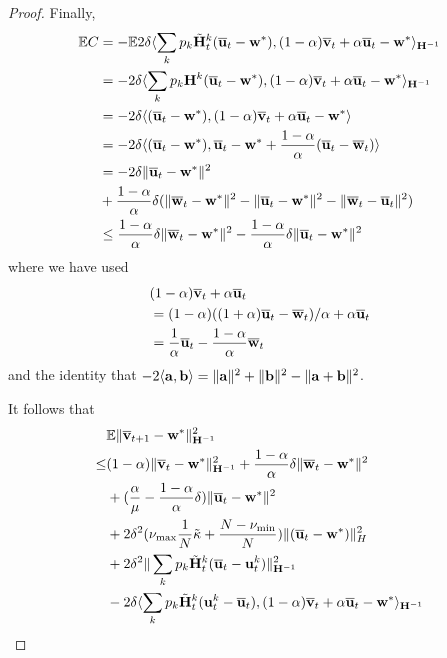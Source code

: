 \begin{proof}
	Finally, 
	\begin{align*}
	\mathbb{E}C & =-\mathbb{E}2\delta\langle\sum_{k}p_{k}\tilde{\vH}_{t}^{k}(\ov{u}_{t}-\vw^{\ast}),(1-\alpha)\ov{v}_{t}+\alpha\ov{u}_{t}-\vw^{\ast}\rangle_{\vH^{-1}}\\
	& =-2\delta\langle\sum_{k}p_{k}\vH^{k}(\ov{u}_{t}-\vw^{\ast}),(1-\alpha)\ov{v}_{t}+\alpha\ov{u}_{t}-\vw^{\ast}\rangle_{\vH^{-1}}\\
	& =-2\delta\langle(\ov{u}_{t}-\vw^{\ast}),(1-\alpha)\ov{v}_{t}+\alpha\ov{u}_{t}-\vw^{\ast}\rangle\\
	& =-2\delta\langle(\ov{u}_{t}-\vw^{\ast}),\ov{u}_{t}-\vw^{\ast}+\frac{1-\alpha}{\alpha}(\ov{u}_{t}-\ov{w}_{t})\rangle\\
	& =-2\delta\|\ov{u}_{t}-\vw^{\ast}\|^{2}\\
	&+\frac{1-\alpha}{\alpha}\delta(\|\ov{w}_{t}-\vw^{\ast}\|^{2}-\|\ov{u}_{t}-\vw^{\ast}\|^{2}-\|\ov{w}_{t}-\ov{u}_{t}\|^{2})\\
	& \leq\frac{1-\alpha}{\alpha}\delta\|\ov{w}_{t}-\vw^{\ast}\|^{2}-\frac{1-\alpha}{\alpha}\delta\|\ov{u}_{t}-\vw^{\ast}\|^{2}
	\end{align*}
	where we have used 
	\begin{align*}
	& (1-\alpha)\ov{v}_{t}+\alpha\ov{u}_{t}\\
	& =(1-\alpha)((1+\alpha)\ov{u}_{t}-\ov{w}_{t})/\alpha+\alpha\ov{u}_{t}\\
	& =\frac{1}{\alpha}\ov{u}_{t}-\frac{1-\alpha}{\alpha}\ov{w}_{t}
	\end{align*}
	and the identity that $-2\langle \va,\vb\rangle=\|\va\|^{2}+\|\vb\|^{2}-\|\va+\vb\|^{2}$. 
	
	It follows that 
	\begin{align*}
	& \mathbb{E}\|\ov{v}_{t+1}-\vw^{\ast}\|_{\vH^{-1}}^{2}\\
	\leq &(1-\alpha)\|\ov{v}_{t}-\vw^{\ast}\|_{\vH^{-1}}^{2}+\frac{1-\alpha}{\alpha}\delta\|\ov{w}_{t}-\vw^{\ast}\|^{2}\\
	& +(\frac{\alpha}{\mu}-\frac{1-\alpha}{\alpha}\delta)\|\ov{u}_{t}-\vw^{\ast}\|^{2}\\
	&+2\delta^{2}(\nu_{\max}\frac{1}{N}\tilde{\kappa}+\frac{N-\nu_{\min}}{N})\|(\ov{u}_{t}-\vw^{\ast})\|_{H}^{2}\\
	& +2\delta^{2}\|\sum_{k}p_{k}\tilde{\vH}_{t}^{k}(\ov{u}_{t}-\vu_{t}^{k})\|_{\vH^{-1}}^{2}\\
	& -2\delta\langle\sum_{k}p_{k}\tilde{\vH}_{t}^{k}(\vu_{t}^{k}-\ov{u}_{t}),(1-\alpha)\ov{v}_{t}+\alpha\ov{u}_{t}-\vw^{\ast}\rangle_{\vH^{-1}}
	\end{align*}
	

\end{proof}
